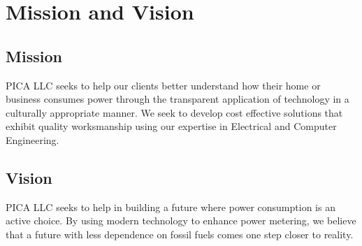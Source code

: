 \section{Mission and Vision}

\subsection{Mission}
PICA LLC seeks to help our clients better understand how their home or business consumes power through the transparent application of technology in a culturally appropriate manner. We seek to develop cost effective solutions that exhibit quality worksmanship using our expertise in Electrical and Computer Engineering.

\subsection{Vision}
PICA LLC seeks to help in building a future where power consumption is an active choice. By using modern technology to enhance power metering, we believe that a future with less dependence on fossil fuels comes one step closer to reality.
